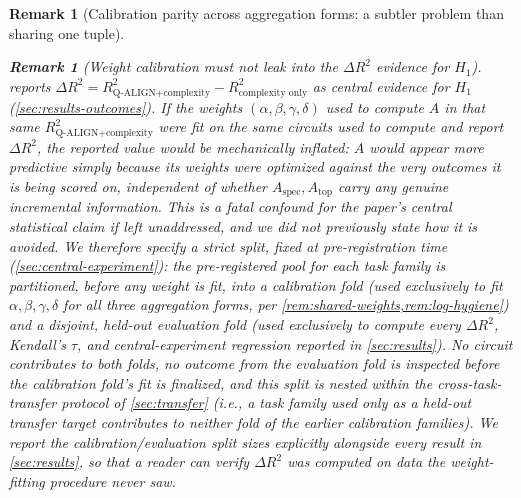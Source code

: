 \documentclass[11pt]{article}
\newtheorem{remark}[theorem]{Remark}
\newcommand{\Aspec}{A_{\mathrm{spec}}}
\newcommand{\Atop}{A_{\mathrm{top}}}
\begin{document}
\begin{remark}[Calibration parity across aggregation forms: a subtler problem than sharing one tuple]
\begin{remark}[Weight calibration must not leak into the $\Delta R^2$ evidence for $H_1$]
\label{rem:no-leakage}
 reports $\Delta R^2 = R^2_{\text{Q-ALIGN+complexity}} - R^2_{\text{complexity only}}$ as central evidence for $H_1$ (\cref{sec:results-outcomes}). If the weights $(\alpha,\beta,\gamma,\delta)$ used to compute $A$ in that same $R^2_{\text{Q-ALIGN+complexity}}$ were fit on the same circuits used to compute and report $\Delta R^2$, the reported value would be mechanically inflated: $A$ would appear more predictive simply because its weights were optimized against the very outcomes it is being scored on, independent of whether $\Aspec,\Atop$ carry any genuine incremental information. This is a fatal confound for the paper's central statistical claim if left unaddressed, and we did not previously state how it is avoided. We therefore specify a strict split, fixed at pre-registration time (\cref{sec:central-experiment}): the pre-registered pool for each task family is partitioned, before any weight is fit, into a \emph{calibration fold} (used exclusively to fit $\alpha,\beta,\gamma,\delta$ for all three aggregation forms, per \cref{rem:shared-weights,rem:log-hygiene}) and a disjoint, held-out \emph{evaluation fold} (used exclusively to compute every $\Delta R^2$, Kendall's $\tau$, and central-experiment regression reported in \cref{sec:results}). No circuit contributes to both folds, no outcome from the evaluation fold is inspected before the calibration fold's fit is finalized, and this split is nested \emph{within} the cross-task-transfer protocol of \cref{sec:transfer} (i.e., a task family used only as a held-out transfer target contributes to neither fold of the earlier calibration families). We report the calibration/evaluation split sizes explicitly alongside every result in \cref{sec:results}, so that a reader can verify $\Delta R^2$ was computed on data the weight-fitting procedure never saw.
\end{remark}
\end{remark}
\end{document}
